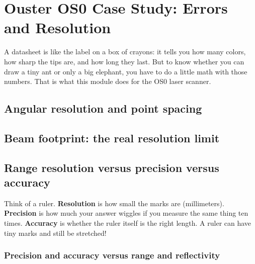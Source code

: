 \chapter{Ouster OS0 Case Study: Errors and Resolution}

\begin{kid}
A datasheet is like the label on a box of crayons: it tells you how many colors, how sharp the tips are, and how long they last. But to know whether you can draw a tiny ant or only a big elephant, you have to do a little math with those numbers. That is what this module does for the OS0 laser scanner.
\end{kid}

\section{Angular resolution and point spacing}


\section{Beam footprint: the real resolution limit}


\section{Range resolution versus precision versus accuracy}

\begin{kid}
Think of a ruler. \textbf{Resolution} is how small the marks are (millimeters). \textbf{Precision} is how much your answer wiggles if you measure the same thing ten times. \textbf{Accuracy} is whether the ruler itself is the right length. A ruler can have tiny marks and still be stretched!
\end{kid}

\subsection{Precision and accuracy versus range and reflectivity}


